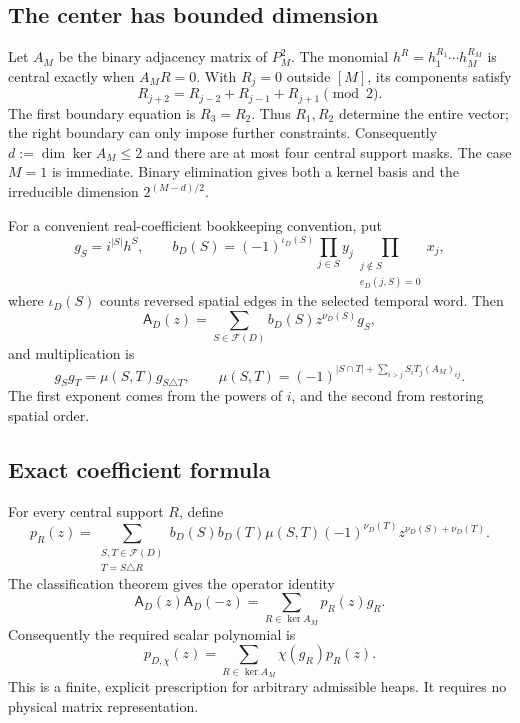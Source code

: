 \documentclass[10pt,letterpaper]{article}
\newcommand{\Ffam}{\mathcal F}
\newcommand{\cA}{\mathsf A}
\begin{document}
\subsection{The center has bounded dimension}
Let $A_M$ be the binary adjacency matrix of $P_M^2$. The monomial $h^R=h_1^{R_1}\cdots h_M^{R_M}$ is central exactly when $A_MR=0$. With $R_j=0$ outside $[M]$, its components satisfy
\begin{equation}\label{eq:central-recurrence}
 R_{j+2}=R_{j-2}+R_{j-1}+R_{j+1}\pmod2.
\end{equation}
The first boundary equation is $R_3=R_2$. Thus $R_1,R_2$ determine the entire vector; the right boundary can only impose further constraints. Consequently $d:=\dim\ker A_M\le2$ and there are at most four central support masks. The case $M=1$ is immediate. Binary elimination gives both a kernel basis and the irreducible dimension $2^{(M-d)/2}$.

For a convenient real-coefficient bookkeeping convention, put
\begin{equation}\label{eq:g-basis}
 g_S=i^{|S|}h^S,\qquad
 b_D(S)=(-1)^{\iota_D(S)}\prod_{j\in S}y_j
       \prod_{\substack{j\notin S\\e_D(j,S)=0}}x_j,
\end{equation}
where $\iota_D(S)$ counts reversed spatial edges in the selected temporal word. Then
\begin{equation}
 \cA_D(z)=\sum_{S\in\Ffam(D)}b_D(S)z^{\nu_D(S)}g_S,
\end{equation}
and multiplication is
\begin{equation}\label{eq:g-multiply}
 g_Sg_T=\mu(S,T)g_{S\triangle T},\qquad
 \mu(S,T)=(-1)^{|S\cap T|+\sum_{i>j}S_iT_j(A_M)_{ij}}.
\end{equation}
The first exponent comes from the powers of $i$, and the second from restoring spatial order.

\subsection{Exact coefficient formula}
For every central support $R$, define
\begin{equation}\label{eq:pR}
 p_R(z)=
 \sum_{\substack{S,T\in\Ffam(D)\\T=S\triangle R}}
 b_D(S)b_D(T)\mu(S,T)(-1)^{\nu_D(T)}
 z^{\nu_D(S)+\nu_D(T)}.
\end{equation}
The classification theorem gives the operator identity
\begin{equation}\label{eq:center-expansion}
 \cA_D(z)\cA_D(-z)=\sum_{R\in\ker A_M}p_R(z)g_R.
\end{equation}
Consequently the required scalar polynomial is
\begin{equation}\label{eq:pchi-explicit}
 \boxed{p_{D,\chi}(z)=\sum_{R\in\ker A_M}\chi(g_R)p_R(z).}
\end{equation}
This is a finite, explicit prescription for arbitrary admissible heaps. It requires no physical matrix representation.
\end{document}
